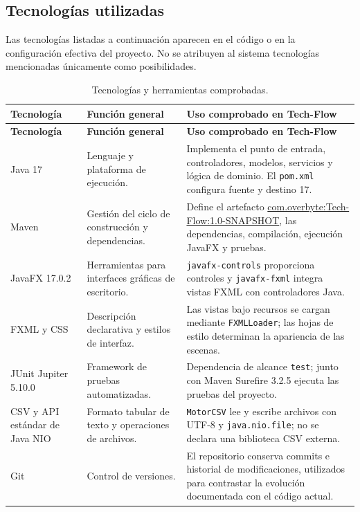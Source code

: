 \subsection{Tecnologías utilizadas}
\label{subsec:tecnologias}

Las tecnologías listadas a continuación aparecen en el código o en la configuración efectiva del proyecto. No se atribuyen al sistema tecnologías mencionadas únicamente como posibilidades.

\begin{longtable}{|p{2.35cm}|p{4.4cm}|p{6.5cm}|}
\caption{Tecnologías y herramientas comprobadas.}
\label{tab:tecnologias}\\
\hline
\textbf{Tecnología} & \textbf{Función general} & \textbf{Uso comprobado en Tech-Flow}\\
\hline
\endfirsthead
\hline
\textbf{Tecnología} & \textbf{Función general} & \textbf{Uso comprobado en Tech-Flow}\\
\hline
\endhead
Java 17 & Lenguaje y plataforma de ejecución. & Implementa el punto de entrada, controladores, modelos, servicios y lógica de dominio. El \texttt{pom.xml} configura fuente y destino 17.\\
\hline
Maven & Gestión del ciclo de construcción y dependencias. & Define el artefacto \url{com.overbyte:Tech-Flow:1.0-SNAPSHOT}, las dependencias, compilación, ejecución JavaFX y pruebas.\\
\hline
JavaFX 17.0.2 & Herramientas para interfaces gráficas de escritorio. & \texttt{javafx-controls} proporciona controles y \texttt{javafx-fxml} integra vistas FXML con controladores Java.\\
\hline
FXML y CSS & Descripción declarativa y estilos de interfaz. & Las vistas bajo recursos se cargan mediante \texttt{FXMLLoader}; las hojas de estilo determinan la apariencia de las escenas.\\
\hline
JUnit Jupiter 5.10.0 & Framework de pruebas automatizadas. & Dependencia de alcance \texttt{test}; junto con Maven Surefire 3.2.5 ejecuta las pruebas del proyecto.\\
\hline
CSV y API estándar de Java NIO & Formato tabular de texto y operaciones de archivos. & \texttt{MotorCSV} lee y escribe archivos con UTF-8 y \texttt{java.nio.file}; no se declara una biblioteca CSV externa.\\
\hline
Git & Control de versiones. & El repositorio conserva commits e historial de modificaciones, utilizados para contrastar la evolución documentada con el código actual.\\
\hline
\end{longtable}

